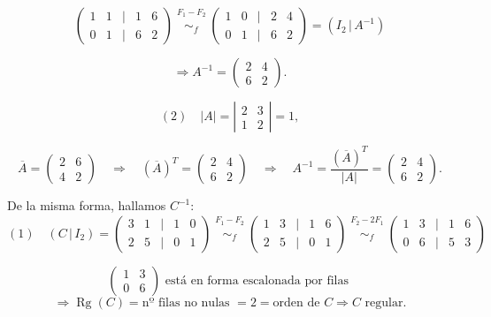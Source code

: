 \documentclass[a4paper,12pt]{article}
\begin{document}
\begin{ejercicio}[title=Ejercicio 19]
\vspace{0.5em}

\[
\begin{pmatrix}
1 & 1 &\Big|& 1 & 6\\
0 & 1 &\Big|& 6 & 2
\end{pmatrix}
\overset{\substack{F_1 - F_2 \\ {}}}{\sim_f}
\begin{pmatrix}
1 & 0 &\Big|& 2 & 4\\
0 & 1 &\Big|& 6 & 2
\end{pmatrix}
= (I_2 \,|\, A^{-1})
\]

\[
\Rightarrow A^{-1} =
\begin{pmatrix}
2 & 4\\
6 & 2
\end{pmatrix}.
\]

\[
(2) \quad |A| =
\left|
\begin{matrix}
2 & 3\\
1 & 2
\end{matrix}
\right| = 1,
\]

\[
\overline{A} =
\begin{pmatrix}
2 & 6\\
4 & 2
\end{pmatrix}
\quad\Rightarrow\quad
(\overline{A})^T =
\begin{pmatrix}
2 & 4\\
6 & 2
\end{pmatrix}
\quad\Rightarrow\quad
A^{-1} = \frac{(\overline{A})^T}{|A|} =
\begin{pmatrix}
2 & 4\\
6 & 2
\end{pmatrix}.
\]

\vspace{0.5em}

De la misma forma, hallamos $C^{-1}$:
\[
(1)\quad (C \,|\, I_2) =
\begin{pmatrix}
3 & 1 &\Big|& 1 & 0\\
2 & 5 &\Big|& 0 & 1
\end{pmatrix}
\overset{\substack{F_1 - F_2 \\ {}}}{\sim_f}
\begin{pmatrix}
1 & 3 &\Big|& 1 & 6\\
2 & 5 &\Big|& 0 & 1
\end{pmatrix}
\overset{\substack{F_2 - 2F_1 \\ {}}}{\sim_f}
\begin{pmatrix}
1 & 3 &\Big|& 1 & 6\\
0 & 6 &\Big|& 5 & 3
\end{pmatrix}
\]

\vspace{0.5em}

\noindent
\[
\begin{pmatrix}
1 & 3\\
0 & 6
\end{pmatrix}
\text{ está en forma escalonada por filas }
\]
\[\Rightarrow \operatorname{Rg}(C) =\text{nº filas no nulas }=2 = \text{orden de }C \Rightarrow C \text{ regular.}
\]
\end{ejercicio}
\end{document}
